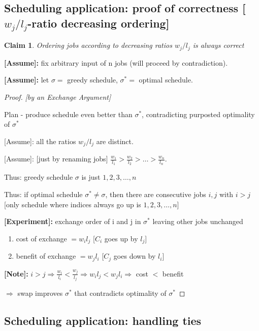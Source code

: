 \documentclass[a4paper,12pt]{article}
\theoremstyle{plain}
\newtheorem{claim}{Claim}
\theoremstyle{definition}
\theoremstyle{remark}
\begin{document}
\subsection{Scheduling application: proof of correctness [$w_j/l_j$-ratio decreasing ordering]}

\begin{claim}Ordering jobs according to decreasing ratios $w_j/l_j$ is always correct\end{claim}

\textbf{[Assume]:} fix arbitrary input of n jobs (will proceed by contradiction).

\textbf{[Assume]:} let $\sigma =$ greedy schedule, $\sigma^* =$ optimal schedule.

\begin{proof}

\textit{[by an Exchange Argument]}

Plan - produce schedule even better than $\sigma^*$, contradicting purposted optimality of $\sigma^*$

[Assume]: all the ratios $w_j/l_j$ are distinct.

[Assume]: [just by renaming jobs] $\frac{w_1}{l_1} > \frac{w_2}{l_2} > \dots > \frac{w_n}{l_n}$.

Thus: greedy schedule $\sigma$ is just $1,2,3,\dots,n$

Thus: if optimal schedule $\sigma^* \neq \sigma$, then there are consecutive jobs $i, j$ with $i > j$ [only schedule where indices always go up is $1,2,3,\dots,n$]

\textbf{[Experiment]:} exchange order of i and j in $\sigma^*$ leaving other jobs unchanged

\begin{enumerate}
\item cost of exchange $= w_il_j$ [$C_i$ goes up by $l_j$]
\item benefit of exchange $= w_jl_i$ [$C_j$ goes down by $l_i$]
\end{enumerate}

\textbf{[Note]:} $i>j \Rightarrow \frac{w_i}{l_i} < \frac{w_j}{l_j} \Rightarrow w_il_j < w_jl_i \Rightarrow$ cost $<$ benefit

$\Rightarrow$ swap improves $\sigma^*$ that contradicts optimality of $\sigma^*$
\end{proof}



\subsection{Scheduling application: handling ties}
\end{document}
